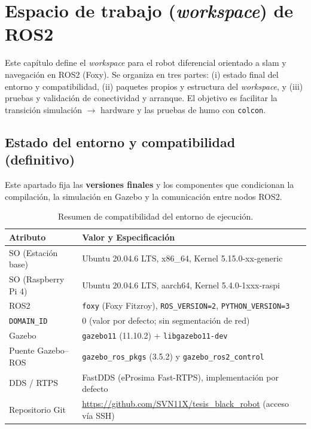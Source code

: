 
\chapter{Espacio de trabajo (\textit{workspace}) de \texorpdfstring{\protect\gls{ROS2}}{ROS 2}}
\label{ch:workspace}

Este capítulo define el \textit{workspace} para el robot diferencial orientado a \gls{slam} y navegación en \gls{ROS2} (Foxy). Se organiza en tres partes: (i) estado final del entorno y compatibilidad, (ii) paquetes propios y estructura del \textit{workspace}, y (iii) pruebas y validación de conectividad y arranque. El objetivo es facilitar la transición simulación $\rightarrow$ hardware y las pruebas de humo con \texttt{colcon}.

\section{Estado del entorno y compatibilidad (definitivo)}
\label{sec:ws_env_state}

Este apartado fija las \textbf{versiones finales} y los componentes que condicionan la compilación, la simulación en Gazebo y la comunicación entre nodos \gls{ROS2}.

\begin{table}[H]
\centering
\small
\caption{Resumen de compatibilidad del entorno de ejecución.}
\label{tab:ws_env_final}
\begin{tabular}{l p{9.5cm}}
\toprule
\textbf{Atributo} & \textbf{Valor y Especificación} \\ 
\midrule
SO (Estación base)   & Ubuntu 20.04.6 LTS, x86\_64, Kernel 5.15.0-xx-generic \\
SO (Raspberry Pi 4)  & Ubuntu 20.04.6 LTS, aarch64, Kernel 5.4.0-1xxx-raspi \\ \addlinespace
\gls{ROS2}                & \texttt{foxy} (Foxy Fitzroy), \texttt{ROS\_VERSION=2}, \texttt{PYTHON\_VERSION=3} \\
\texttt{DOMAIN\_ID}  & 0 (valor por defecto; sin segmentación de red) \\ \addlinespace
Gazebo               & \texttt{gazebo11} (11.10.2) + \texttt{libgazebo11-dev} \\
Puente Gazebo--ROS   & \texttt{gazebo\_ros\_pkgs} (3.5.2) y \texttt{gazebo\_ros2\_control} \\ \addlinespace
DDS / RTPS           & FastDDS (eProsima Fast-RTPS), implementación por defecto \\
Repositorio Git      & \url{https://github.com/SVN11X/tesis_black_robot} (acceso vía SSH) \\ 
\bottomrule
\end{tabular}
\end{table}

